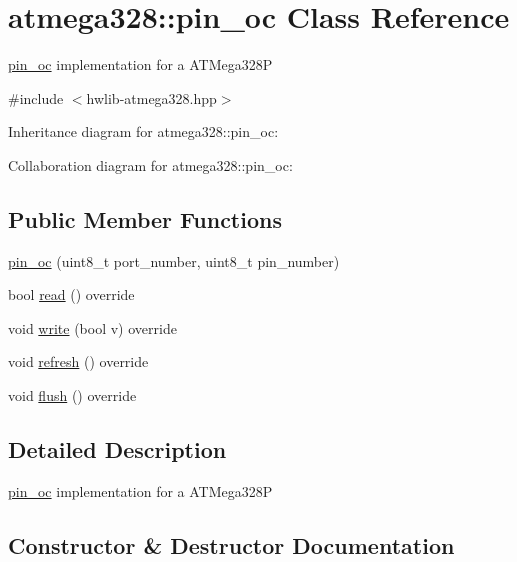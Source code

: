 \hypertarget{classatmega328_1_1pin__oc}{}\section{atmega328\+:\+:pin\+\_\+oc Class Reference}
\label{classatmega328_1_1pin__oc}


\hyperlink{classatmega328_1_1pin__oc}{pin\+\_\+oc} implementation for a A\+T\+Mega328P  




{\ttfamily \#include $<$hwlib-\/atmega328.\+hpp$>$}



Inheritance diagram for atmega328\+:\+:pin\+\_\+oc\+:


Collaboration diagram for atmega328\+:\+:pin\+\_\+oc\+:
\subsection*{Public Member Functions}
\begin{DoxyCompactItemize}
\item 
\hyperlink{classatmega328_1_1pin__oc_a53c3878f8ede2967888513bd18350444}{pin\+\_\+oc} (uint8\+\_\+t port\+\_\+number, uint8\+\_\+t pin\+\_\+number)
\item 
bool \hyperlink{classatmega328_1_1pin__oc_a89733673f7d2e2e96b2b71dbabf4505a}{read} () override
\item 
void \hyperlink{classatmega328_1_1pin__oc_a9eb229792f730515636057cd97609b43}{write} (bool v) override
\item 
void \hyperlink{classatmega328_1_1pin__oc_a1768ece62a74ed6f657427cb0db5b5e3}{refresh} () override
\item 
void \hyperlink{classatmega328_1_1pin__oc_a3eb816793385d952d5fb00f473b07349}{flush} () override
\end{DoxyCompactItemize}


\subsection{Detailed Description}
\hyperlink{classatmega328_1_1pin__oc}{pin\+\_\+oc} implementation for a A\+T\+Mega328P 

\subsection{Constructor \& Destructor Documentation}
\mbox{\label{classatmega328_1_1pin__oc_a53c3878f8ede2967888513bd18350444}} 
